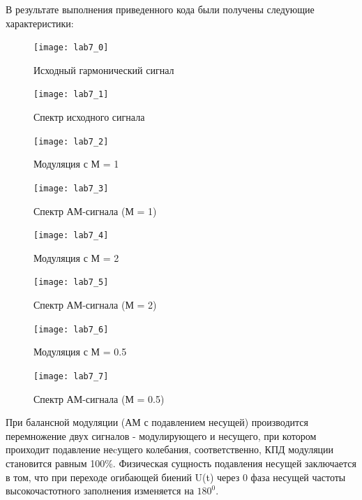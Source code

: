 \documentclass[10pt,a4paper]{article}
\begin{document}
В результате выполнения приведенного кода были получены следующие характеристики:

\begin{figure}[h]\centering
  \parbox[b]{0.49\textwidth}{\centering
    \texttt{[image: lab7\_0]} 
    \caption{Исходный гармонический сигнал}\label{fig.l7_0}}
  \hfil\hfil 
  \begin{minipage}[b]{0.49\textwidth}
	\centering
	\texttt{[image: lab7\_1]}
	\caption{Спектр исходного сигнала}\label{fig.l7_1} 
  \end{minipage}
\end{figure}

\begin{figure}[h]\centering
  \parbox[b]{0.49\textwidth}{\centering
    \texttt{[image: lab7\_2]} 
    \caption{Модуляция с М = 1}\label{fig.l7_2}}
  \hfil\hfil 
  \begin{minipage}[b]{0.49\textwidth}
	\centering
	\texttt{[image: lab7\_3]}
	\caption{Спектр АМ-сигнала (М = 1)}\label{fig.l7_3} 
  \end{minipage}
\end{figure}

\begin{figure}[h]\centering
  \parbox[b]{0.49\textwidth}{\centering
    \texttt{[image: lab7\_4]} 
    \caption{Модуляция с М = 2}\label{fig.l7_4}}
  \hfil\hfil 
  \begin{minipage}[b]{0.49\textwidth}
	\centering
	\texttt{[image: lab7\_5]}
	\caption{Спектр АМ-сигнала (М = 2)}\label{fig.l7_5} 
  \end{minipage}
\end{figure}

\begin{figure}[h]\centering
  \parbox[b]{0.49\textwidth}{\centering
    \texttt{[image: lab7\_6]} 
    \caption{Модуляция с М = 0.5}\label{fig.l7_6}}
  \hfil\hfil 
  \begin{minipage}[b]{0.49\textwidth}
	\centering
	\texttt{[image: lab7\_7]}
	\caption{Спектр АМ-сигнала (М = 0.5)}\label{fig.l7_7} 
  \end{minipage}
\end{figure}

\FloatBarrier

При балансной модуляции (АМ с подавлением несущей) производится перемножение двух сигналов - модулирующего и несущего, при котором проиходит подавление неcущего колебания, соответственно, КПД модуляции становится равным 100\%. 
Физическая сущность подавления несущей заключается в том, что при переходе огибающей биений U(t) через 0 фаза несущей частоты высокочастотного заполнения изменяется на $180^0$.
\end{document}
